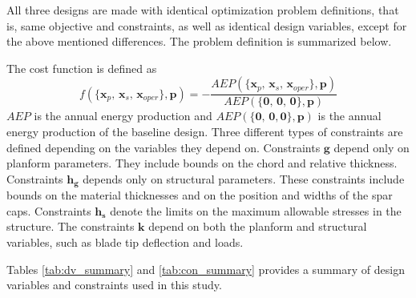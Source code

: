 All three designs are made with identical optimization problem definitions, that is, same objective and constraints, as well as identical design variables, except for the above mentioned differences. The problem definition is summarized below.

The cost function is defined as
\begin{equation}
f(\{\mathbf{x}_p,\,
	\mathbf{x}_s,\,
	\mathbf{x}_{oper}\},
	\mathbf{p}) = -\frac{AEP(\{\mathbf{x}_p,\,
						  		 \mathbf{x}_s,\,
						  		 \mathbf{x}_{oper}\},
						  		 \mathbf{p})}
						  {AEP(\{\mathbf{0},\,
								\mathbf{0},\,
								\mathbf{0}\},
								\mathbf{p})}	
\label{eqn:objective}
\end{equation}
$AEP$ is the annual energy production and $AEP(\{\mathbf{0},\,\mathbf{0},\mathbf{0}\}, \mathbf{p})$ is the annual energy production of the baseline design.
Three different types of constraints are defined depending on the variables they depend on. 
Constraints $\mathbf{g}$ depend only on planform parameters. 
They include bounds on the chord and relative thickness. 
Constraints $\mathbf{h_g}$ depends only on structural parameters.
These constraints include bounds on the material thicknesses and on the position and widths of the spar caps. 
Constraints $\mathbf{h_s}$ denote the limits on the maximum allowable stresses in the structure.
The constraints $\mathbf{k}$ depend on both the planform and structural variables, such as blade tip deflection and loads.

Tables \ref{tab:dv_summary} and \ref{tab:con_summary} provides a summary of design variables and constraints used in this study.

